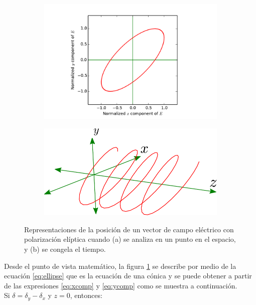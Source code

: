 \begin{figure}[h!]
\centering
\begin{subfigure}{.45\textwidth}
  \centering
  \includegraphics[width=1\linewidth]{ellipse_clean}
  \caption{}
\label{fig:ellipse_clean}
\end{subfigure}\qquad
\begin{subfigure}{.45\textwidth}
  \centering
  \includegraphics[width=.8\linewidth]{trayectory_clean}
  \caption{}
  \label{fig:trayectory_clean}
\end{subfigure}
\caption{Representaciones de la posición de un vector de campo
  eléctrico con polarización elíptica cuando (a) se analiza en un
  punto en el espacio, y (b) se  congela el tiempo.} 
\label{fig:general_field}
\end{figure} 

Desde el punto de vista matemático, la figura
\ref{fig:ellipse_clean} se describe por medio de la ecuación
\ref{eq:ellipse} que es la ecuación de una cónica y se puede obtener
a partir de las expresiones \ref{eq:xcomp} y \ref{eq:ycomp} como se
muestra a continuación.\\ Si $\delta = \delta_y-\delta_x$ y $z=0$,
entonces:

